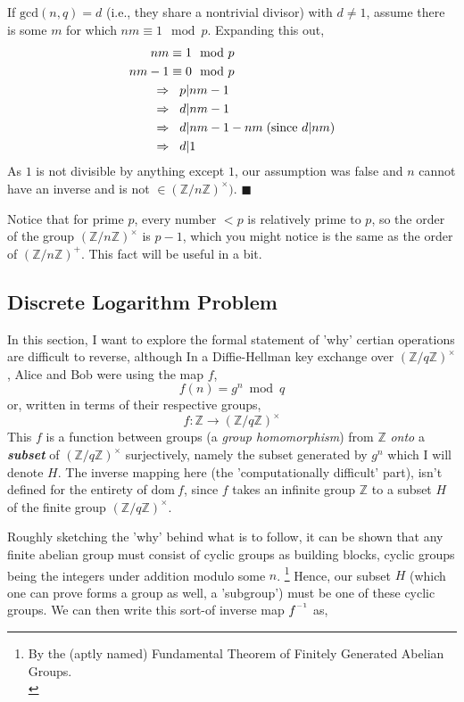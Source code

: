 \documentclass[11pt, a4paper]{report}
\newcommand{\inv}{^{\raisebox{.2em}{$\scriptscriptstyle-1$}}}
\newcommand{\qed}{\hfill $\blacksquare$}
\newcommand{\integers}{\mathbb{Z}}
\begin{document}
	If $\mathrm{gcd}(n,q) = d$ (i.e., they share a nontrivial divisor) with $d \neq 1$, assume there is some $m$ for which $nm \equiv 1 \mod p$. Expanding this out,
\begin{align*}
	nm &\equiv 1 \mod p\\
	nm - 1 &\equiv 0 \mod p\\
	\Rightarrow &\hspace*{0.3cm} p | nm-1\\
	\Rightarrow &\hspace*{0.3cm} d | nm-1\\
	\Rightarrow &\hspace*{0.3cm} d | nm-1 -nm\; (\text{since } d|nm)\\
	\Rightarrow &\hspace*{0.3cm} d | 1
\end{align*}
As $1$ is not divisible by anything except $1$, our assumption was false and $n$ cannot have an inverse and is not $\in (\integers / n \integers)^{\times})$.\autocite[19]{koblitz} 
\qed

Notice that for prime $p$, every number $< p$ is relatively prime to $p$, so the order of the group $(\integers / n \integers)^{\times}$ is $p-1$, which you might notice is the same as the order of $(\integers / n \integers)^{+}$. This fact will be useful in a bit.


\subsection{Discrete Logarithm Problem}

In this section, I want to explore the formal statement of 'why' certian operations are difficult to reverse, although  In a Diffie-Hellman key exchange over $(\integers / q \integers)^{\times}$, Alice and Bob were using the map $f$,
\[ f(n) = g^n \bmod q \]
or, written in terms of their respective groups,
\[ f: \integers \rightarrow (\integers / q \integers)^{\times} \]
This $f$ is a function between groups (a \textit{group homomorphism}) from $\integers$ \textit{onto} a \textit{\textbf{subset}} of $(\integers / q \integers)^{\times}$ surjectively, namely the subset generated by $g^n$ which I will denote $H$. The inverse mapping here (the 'computationally difficult' part), isn't defined for the entirety of $\mathrm{dom}\: f$, since $f$ takes an infinite group $\integers$ to a subset $H$ of the finite group $(\integers / q \integers)^{\times}$. 

Roughly sketching the 'why' behind what is to follow, it can be shown that any finite abelian group must consist of cyclic groups as building blocks, cyclic groups being the integers under addition modulo some $n$. \footnote{By the (aptly named) Fundamental Theorem of Finitely Generated Abelian Groups. \\\autocite[134]{saracino}} Hence, our subset $H$ (which one can prove forms a group as well, a 'subgroup') must be one of these cyclic groups. We can then write this sort-of inverse map $f\inv$ as,
\end{document}
